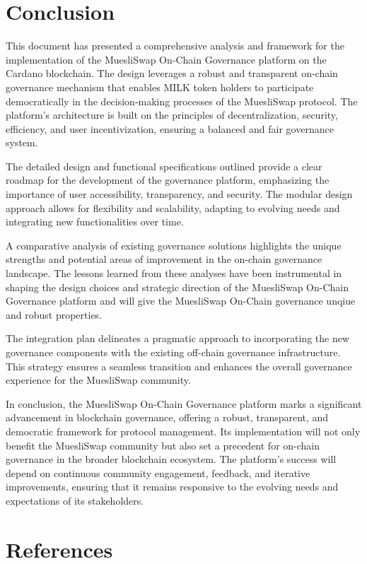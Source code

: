 \documentclass[11pt]{article}
\begin{document}
\section{Conclusion}

This document has presented a comprehensive analysis and framework for the implementation of the MuesliSwap On-Chain Governance platform on the Cardano blockchain. The design leverages a robust and transparent on-chain governance mechanism that enables MILK token holders to participate democratically in the decision-making processes of the MuesliSwap protocol. The platform's architecture is built on the principles of decentralization, security, efficiency, and user incentivization, ensuring a balanced and fair governance system.

The detailed design and functional specifications outlined provide a clear roadmap for the development of the governance platform, emphasizing the importance of user accessibility, transparency, and security.
The modular design approach allows for flexibility and scalability, adapting to evolving needs and integrating new functionalities over time.

A comparative analysis of existing governance solutions highlights the unique strengths and potential areas of improvement in the on-chain governance landscape.
The lessons learned from these analyses have been instrumental in shaping the design choices and strategic direction of the MuesliSwap On-Chain Governance platform
and will give the MuesliSwap On-Chain governance unqiue and robust properties.

The integration plan delineates a pragmatic approach to incorporating the new governance components with the existing off-chain governance infrastructure.
This strategy ensures a seamless transition and enhances the overall governance experience for the MuesliSwap community.

In conclusion, the MuesliSwap On-Chain Governance platform marks a significant advancement in blockchain governance, offering a robust, transparent, and democratic framework for protocol management.
Its implementation will not only benefit the MuesliSwap community but also set a precedent for on-chain governance in the broader blockchain ecosystem.
The platform's success will depend on continuous community engagement, feedback, and iterative improvements, ensuring that it remains responsive to the evolving needs and expectations of its stakeholders.

\section{References}

\printbibliography
\end{document}
